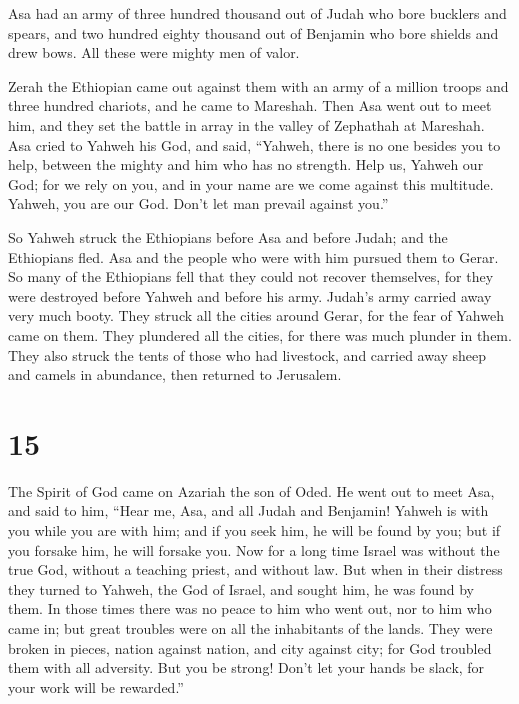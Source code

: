  Asa had an army of three hundred thousand out of Judah
who bore bucklers and spears, and two hundred eighty thousand out of
Benjamin who bore shields and drew bows. All these were mighty men of
valor.

 Zerah the Ethiopian came out against them with an army of
a million troops and three hundred chariots, and he came to Mareshah.
 Then Asa went out to meet him, and they set the battle
in array in the valley of Zephathah at Mareshah.  Asa
cried to Yahweh his God, and said, ``Yahweh, there is no one besides you
to help, between the mighty and him who has no strength. Help us, Yahweh
our God; for we rely on you, and in your name are we come against this
multitude. Yahweh, you are our God. Don't let man prevail against you.''

 So Yahweh struck the Ethiopians before Asa and before
Judah; and the Ethiopians fled.  Asa and the people who
were with him pursued them to Gerar. So many of the Ethiopians fell that
they could not recover themselves, for they were destroyed before Yahweh
and before his army. Judah's army carried away very much booty.
 They struck all the cities around Gerar, for the fear of
Yahweh came on them. They plundered all the cities, for there was much
plunder in them.  They also struck the tents of those who
had livestock, and carried away sheep and camels in abundance, then
returned to Jerusalem.

\hypertarget{section-14}{%
\section{15}\label{section-14}}

 The Spirit of God came on Azariah the son of Oded.
 He went out to meet Asa, and said to him, ``Hear me, Asa,
and all Judah and Benjamin! Yahweh is with you while you are with him;
and if you seek him, he will be found by you; but if you forsake him, he
will forsake you.  Now for a long time Israel was without
the true God, without a teaching priest, and without law. 
But when in their distress they turned to Yahweh, the God of Israel, and
sought him, he was found by them.  In those times there
was no peace to him who went out, nor to him who came in; but great
troubles were on all the inhabitants of the lands.  They
were broken in pieces, nation against nation, and city against city; for
God troubled them with all adversity.  But you be strong!
Don't let your hands be slack, for your work will be rewarded.''

